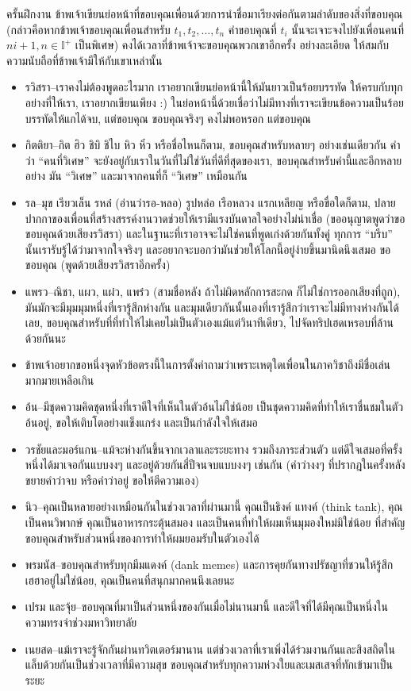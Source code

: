 ครั้นฝึกงาน ข้าพเจ้าเขียนย่อหน้าที่ขอบคุณเพื่อนด้วยการนำชื่อมาเรียงต่อกันตามลำดับของสิ่งที่ขอบคุณ (กล่าวคือหากข้าพเจ้าขอบคุณเพื่อนสำหรับ \(t_1, t_2, \dots, t_n\) คำขอบคุณที่ \(t_i\) นั้นจะเจาะจงไปยังเพื่อนคนที่ \(ni+1, n \in \mathbb{I}^+\) เป็นพิเศษ) คงได้เวลาที่ข้าพเจ้าจะขอบคุณพวกเขาอีกครั้ง อย่างละเอียด ให้สมกับความนับถือที่ข้าพเจ้ามีให้กับเขาเหล่านั้น
\begin{itemize}
    \item รวิสรา--เราคงไม่ต้องพูดอะไรมาก เราอยากเขียนย่อหน้านี้ให้มันยาวเป็นร้อยบรรทัด ให้ครบกับทุกอย่างที่ให้เรา, เราอยากเขียนเพียง :) ในย่อหน้านี้ด้วยเชื่อว่าไม่มีทางที่เราจะเขียนข้อความเป็นร้อยบรรทัดให้แกได้จบ, แต่ขอบคุณ ขอบคุณจริงๆ คงไม่พอหรอก แต่ขอบคุณ
    \item กิตติยา--กิต ฮิว ชิบิ ชิไบ หิว หิ๋ว หรือชื่อไหนก็ตาม, ขอบคุณสำหรับหลายๆ อย่างเช่นเดียวกัน คำว่า ``คนที่วิเศษ'' จะยังอยู่กับเราในวันที่ไม่ใช่วันที่ดีที่สุดของเรา, ขอบคุณสำหรับคำนี้และอีกหลายอย่าง มัน ``วิเศษ'' และมาจากคนที่ก็ ``วิเศษ'' เหมือนกัน
    \item รล--มุข เรียวเล็น รหล๋ (อ่านว่ารอ-หลอ) รูปหล่อ เรือหลวง แรกเหลียญ หรือขื่อใดก็ตาม, ปลายปากกาของเพื่อนที่สร้างสรรค์งานวาดช่วยให้เรามีแรงบันดาลใจอย่างไม่น่าเชื่อ (ขออนุญาตพูดว่าขอขอบคุณด้วยเสียงรวิสรา) และในฐานะที่เราอาจจะไม่ใช่คนที่พูดเก่งด้วยกันทั้งคู่ ทุกการ ``บรีบ'' นั้นเรารับรู้ได้ว่ามาจากใจจริงๆ และอยากจะบอกว่ามันช่วยให้โลกนี้อยู่ง่ายขึ้นมานิดนึงเสมอ ขอขอบคุณ (พูดด้วยเสียงรวิสราอีกครั้ง)
    \item แพรว--ณิชา, แผว, แผ๋ว, แพร๋ว (สามชื่อหลัง ถ้าไม่ผิดหลักการสะกด ก็ไม่ใช่การออกเสียงที่ถูก), มันมักจะมีมุมมุมหนึ่งที่เรารู้สึกห่างกัน และมุมเดียวกันนั้นเองที่เรารู้สึกว่าเราจะไม่มีทางห่างกันได้เลย, ขอบคุณสำหรับที่ที่ทำให้ไม่เคยไม่เป็นตัวเองแม้แต่วินาทีเดียว, ไปจัดทริปเฮดเหรอบที่ล้านด้วยกันนะ
    \item ข้าพเจ้าอยากขอหนึ่งจุดหัวข้อตรงนี้ในการตั้งคำถามว่าเพราะเหตุใดเพื่อนในภาควิชาถึงมีชื่อเล่นมากมายเหลือเกิน
    \item อ้น--มีชุดความคิดชุดหนึ่งที่เราดีใจที่เห็นในตัวอ้นไม่ใช่น้อย เป็นชุดความคิดที่ทำให้เราชื่นชมในตัวอ้นอยู่, ขอให้เติบโตอย่างแข็งแกร่ง และเป็นกำลังใจให้เสมอ
    \item วรชัยและมอร์แกน--แม้จะห่างกันขึ้นจากเวลาและระยะทาง รวมถึงภาระส่วนตัว แต่ดีใจเสมอที่ครั้งหนึ่งได้มาเจอกันแบบงงๆ และอยู่ด้วยกันสี่ปีจนจบแบบงงๆ เช่นกัน (คำว่างงๆ ที่ปรากฎในครั้งหลัง ขยายคำว่าจบ หรือคำว่าอยู่ ขอให้ตีความเอง)
    \item นิว--คุณเป็นหลายอย่างเหมือนกันในช่วงเวลาที่ผ่านมานี้ คุณเป็นธิงค์ แทงค์ (think tank), คุณเป็นคนวิพากษ์ คุณเป็นอาหารกระตุ้นสมอง และเป็นคนที่ทำให้ผมเห็นมุมองใหม่มิใช่น้อย ที่สำคัญ ขอบคุณสำหรับส่วนหนึ่งของการทำให้ผมยอมรับในตัวเองได้
    \item พรมนัส--ขอบคุณสำหรับทุกมีมแดงค์ (dank memes) และการคุยกันทางปรัชญาที่ชวนให้รู้สึกเฮฮาอยู่ไม่ใช่น้อย, คุณเป็นคนที่สนุกมากคนนึงเลยนะ
    \item เปรม และจุ้ย--ขอบคุณที่มาเป็นส่วนหนึ่งของกันเมื่อไม่นานมานี้ และดีใจที่ได้มีคุณเป็นหนึ่งในความทรงจำช่วงมหาวิทยาลัย
    \item เนยสด--แม้เราจะรู้จักกันผ่านทวิตเตอร์มานาน แต่ช่วงเวลาที่เราเพิ่งได้ร่วมงานกันและสิงสถิตในแล็บด้วยกันเป็นช่วงเวลาที่มีความสุข ขอบคุณสำหรับทุกความห่วงใยและเมสเสจที่ทักเข้ามาเป็นระยะ
\end{itemize}
